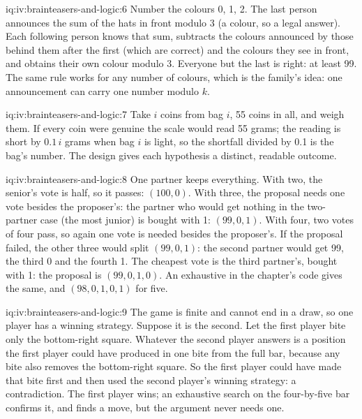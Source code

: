 \begin{solution}{iq:iv:brainteasers-and-logic:6}
Number the colours 0, 1, 2. The last person announces the sum of the hats in front modulo 3 (a colour, so a
legal answer). Each following person knows that sum, subtracts the colours announced by those behind them after
the first (which are correct) and the colours they see in front, and obtains their own colour modulo 3. Everyone
but the last is right: at least 99. The same rule works for any number of colours, which is the family's idea:
one announcement can carry one number modulo $k$.
\end{solution}

\begin{solution}{iq:iv:brainteasers-and-logic:7}
Take $i$ coins from bag $i$, 55 coins in all, and weigh them. If every coin were genuine the scale would read
55 grams; the reading is short by $0.1\,i$ grams when bag $i$ is light, so the shortfall divided by 0.1 is the bag's
number. The design gives each hypothesis a distinct, readable outcome.
\end{solution}

\begin{solution}{iq:iv:brainteasers-and-logic:8}
One partner keeps everything. With two, the senior's vote is half, so it passes: $(100, 0)$. With three, the
proposal needs one vote besides the proposer's: the partner who would get nothing in the two-partner case (the
most junior) is bought with 1: $(99, 0, 1)$. With four, two votes of four pass, so again one vote is needed
besides the proposer's. If the proposal failed, the other three would split $(99, 0, 1)$: the second partner would
get 99, the third 0 and the fourth 1. The cheapest vote is the third partner's, bought with 1: the proposal is
$(99, 0, 1, 0)$. An exhaustive
 in the chapter's code gives the same, and $(98, 0, 1, 0, 1)$ for five.
\end{solution}

\begin{solution}{iq:iv:brainteasers-and-logic:9}
The game is finite and cannot end in a draw, so one player has a winning strategy. Suppose it is the second.
Let the first player bite only the bottom-right square. Whatever the second player answers is a position the
first player could have produced in one bite from the full bar, because any bite also removes the bottom-right
square. So the first player could have made that bite first and then used the second player's winning strategy:
a contradiction. The first player wins; an exhaustive search on the four-by-five bar confirms it, and finds a
move, but the argument never needs one.
\end{solution}

